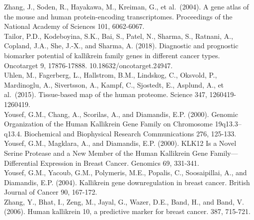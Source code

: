 \documentclass[
]{article}
\begin{document}
Zhang, J., Soden, R., Hayakawa, M., Kreiman, G., et al.~(2004). A gene
atlas of the mouse and human protein-encoding transcriptomes.
Proceedings of the National Academy of Sciences 101, 6062-6067.\\
Tailor, P.D., Kodeboyina, S.K., Bai, S., Patel, N., Sharma, S., Ratnani,
A., Copland, J.A., She, J.-X., and Sharma, A. (2018). Diagnostic and
prognostic biomarker potential of kallikrein family genes in different
cancer types. Oncotarget 9, 17876-17888. 10.18632/oncotarget.24947.\\
Uhlen, M., Fagerberg, L., Hallstrom, B.M., Lindskog, C., Oksvold, P.,
Mardinoglu, A., Sivertsson, A., Kampf, C., Sjostedt, E., Asplund, A., et
al.~(2015). Tissue-based map of the human proteome. Science 347,
1260419-1260419.\\
Yousef, G.M., Chang, A., Scorilas, A., and Diamandis, E.P. (2000).
Genomic Organization of the Human Kallikrein Gene Family on Chromosome
19q13.3--q13.4. Biochemical and Biophysical Research Communications 276,
125-133.\\
Yousef, G.M., Magklara, A., and Diamandis, E.P. (2000). KLK12 Is a Novel
Serine Protease and a New Member of the Human Kallikrein Gene
Family---Differential Expression in Breast Cancer. Genomics 69,
331-341.\\
Yousef, G.M., Yacoub, G.M., Polymeris, M.E., Popalis, C., Soosaipillai,
A., and Diamandis, E.P. (2004). Kallikrein gene downregulation in breast
cancer. British Journal of Cancer 90, 167-172.\\
Zhang, Y., Bhat, I., Zeng, M., Jayal, G., Wazer, D.E., Band, H., and
Band, V. (2006). Human kallikrein 10, a predictive marker for breast
cancer. 387, 715-721.
\end{document}
